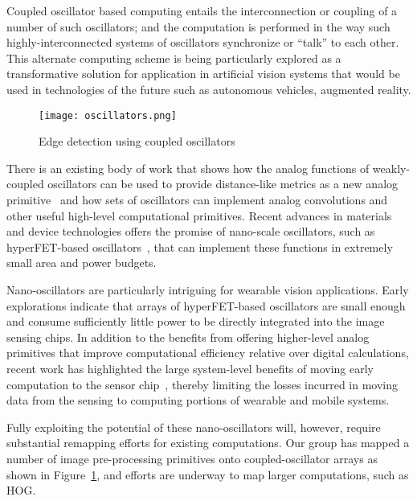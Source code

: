 Coupled oscillator based computing entails the interconnection 
or coupling of a number of such oscillators; 
and the computation is performed in the way 
such highly-interconnected systems of 
oscillators synchronize or ``talk'' to each other. 
This alternate computing scheme is 
being particularly explored as a transformative solution for 
application in artificial vision systems 
that would be used in technologies of the future such as autonomous vehicles, 
augmented reality.

\begin{figure}[!htb]
\centering
\texttt{[image: oscillators.png]}
\caption{Edge detection using coupled oscillators}
\label{fig:osc}
\end{figure} 

There is an existing
body of work that shows how the analog functions of weakly-coupled
oscillators can be used to provide distance-like metrics as a new
analog primitive~\cite{upitt} and how sets of oscillators can implement
analog convolutions and other useful high-level computational
primitives. Recent advances in materials and device technologies
offers the promise of nano-scale oscillators, such as hyperFET-based
oscillators~\cite{wtsai}, that can implement these functions in extremely
small area and power budgets.

Nano-oscillators are particularly intriguing for wearable vision
applications. Early explorations indicate that arrays of
hyperFET-based oscillators are small enough and consume sufficiently
little power to be directly integrated into the image sensing
chips. In addition to the benefits from offering higher-level analog
primitives that improve computational efficiency relative over digital
calculations, recent work has highlighted the large system-level
benefits of moving early computation to the sensor chip~\cite{redeye},
thereby limiting the losses incurred in moving data from the sensing
to computing portions of wearable and mobile systems. 

Fully exploiting
the potential of these nano-oscillators will, however, require
substantial remapping efforts for existing computations. 
Our group has
mapped a number of image pre-processing primitives onto
coupled-oscillator arrays as shown in Figure~\ref{fig:osc}, and efforts are underway to map larger
computations, such as HOG.
